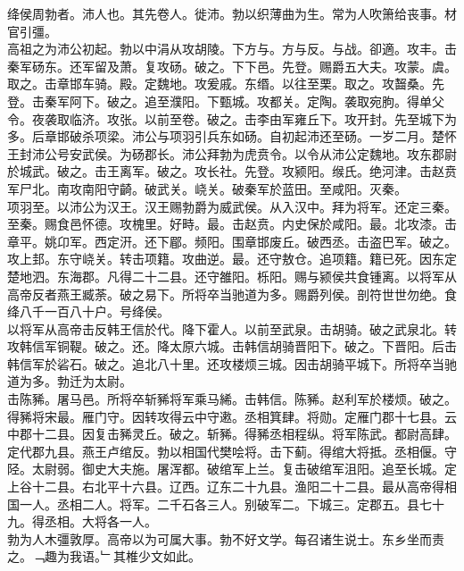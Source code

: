 \documentclass{zhvt-classic}
\begin{document}

\hspace*{2em}绛侯周勃者。沛人也。其先卷人。徙沛。勃以织薄曲为生。常为人吹箫给丧事。材官引彊。\\
\hspace*{2em}高祖之为沛公初起。勃以中涓从攻胡陵。下方与。方与反。与战。卻適。攻丰。击秦军砀东。还军留及萧。复攻砀。破之。下下邑。先登。赐爵五大夫。攻蒙。虞。取之。击章邯车骑。殿。定魏地。攻爰戚。东缗。以往至栗。取之。攻齧桑。先登。击秦军阿下。破之。追至濮阳。下甄城。攻都关。定陶。袭取宛朐。得单父令。夜袭取临济。攻张。以前至卷。破之。击李由军雍丘下。攻开封。先至城下为多。后章邯破杀项梁。沛公与项羽引兵东如砀。自初起沛还至砀。一岁二月。楚怀王封沛公号安武侯。为砀郡长。沛公拜勃为虎贲令。以令从沛公定魏地。攻东郡尉於城武。破之。击王离军。破之。攻长社。先登。攻颍阳。缑氏。绝河津。击赵贲军尸北。南攻南阳守齮。破武关。峣关。破秦军於蓝田。至咸阳。灭秦。\\
\hspace*{2em}项羽至。以沛公为汉王。汉王赐勃爵为威武侯。从入汉中。拜为将军。还定三秦。至秦。赐食邑怀德。攻槐里。好畤。最。击赵贲。内史保於咸阳。最。北攻漆。击章平。姚卬军。西定汧。还下郿。频阳。围章邯废丘。破西丞。击盗巴军。破之。攻上邽。东守峣关。转击项籍。攻曲逆。最。还守敖仓。追项籍。籍已死。因东定楚地泗。东海郡。凡得二十二县。还守雒阳。栎阳。赐与颍侯共食锺离。以将军从高帝反者燕王臧荼。破之易下。所将卒当驰道为多。赐爵列侯。剖符世世勿绝。食绛八千一百八十户。号绛侯。\\
\hspace*{2em}以将军从高帝击反韩王信於代。降下霍人。以前至武泉。击胡骑。破之武泉北。转攻韩信军铜鞮。破之。还。降太原六城。击韩信胡骑晋阳下。破之。下晋阳。后击韩信军於硰石。破之。追北八十里。还攻楼烦三城。因击胡骑平城下。所将卒当驰道为多。勃迁为太尉。\\
\hspace*{2em}击陈豨。屠马邑。所将卒斩豨将军乘马絺。击韩信。陈豨。赵利军於楼烦。破之。得豨将宋最。雁门守。因转攻得云中守遫。丞相箕肆。将勋。定雁门郡十七县。云中郡十二县。因复击豨灵丘。破之。斩豨。得豨丞相程纵。将军陈武。都尉高肆。定代郡九县。燕王卢绾反。勃以相国代樊哙将。击下蓟。得绾大将抵。丞相偃。守陉。太尉弱。御史大夫施。屠浑都。破绾军上兰。复击破绾军沮阳。追至长城。定上谷十二县。右北平十六县。辽西。辽东二十九县。渔阳二十二县。最从高帝得相国一人。丞相二人。将军。二千石各三人。别破军二。下城三。定郡五。县七十九。得丞相。大将各一人。\\
\hspace*{2em}勃为人木彊敦厚。高帝以为可属大事。勃不好文学。每召诸生说士。东乡坐而责之。﹁趣为我语。﹂其椎少文如此。\\
\end{document}
